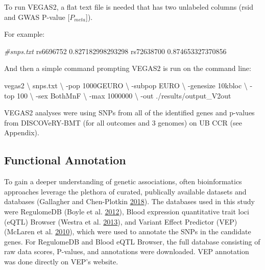\documentclass[]{DissertateOSU}
\newenvironment{Shaded}{\begin{snugshade}}{\end{snugshade}}
\newcommand{\CommentTok}[1]{\textcolor[rgb]{0.56,0.35,0.01}{\textit{#1}}}
\newcommand{\ExtensionTok}[1]{#1}
\newcommand{\NormalTok}[1]{#1}
\begin{document}
To run VEGAS2, a flat text file is needed that has two unlabeled columns
(rsid and GWAS P-value {[}\(P_{meta}\){]}).

\noindent For example:

\singlespaced

\begin{Shaded}
\begin{Highlighting}[]
\CommentTok{#snps.txt}
\ExtensionTok{rs6696752}\NormalTok{   0.827182998293298}
\ExtensionTok{rs72638700}\NormalTok{  0.874653327370856}
\end{Highlighting}
\end{Shaded}

\doublespaced

\noindent And then a simple command prompting VEGAS2 is run on the
command line:

\singlespaced

\begin{Shaded}
\begin{Highlighting}[]
\ExtensionTok{vegas2}\NormalTok{ \textbackslash{}}
\NormalTok{    snps.txt \textbackslash{}}
\NormalTok{    -pop 1000GEURO \textbackslash{}}
\NormalTok{    -subpop EURO \textbackslash{}}
\NormalTok{    -genesize 10kbloc \textbackslash{}}
\NormalTok{    -top 100 \textbackslash{}}
\NormalTok{    -sex BothMnF \textbackslash{}}
\NormalTok{    -max 1000000 \textbackslash{}}
\NormalTok{    -out ./results/output_V2out }
\end{Highlighting}
\end{Shaded}

\doublespaced
\noindent VEGAS2 analyses were using SNPs from all of the identified
genes and p-values from DISCOVeRY-BMT (for all outcomes and 3 genomes)
on UB CCR (see Appendix).

\subsection{Functional Annotation}\label{functional-annotation}

To gain a deeper understanding of genetic associations, often
bioinformatics approaches leverage the plethora of curated, publically
available datasets and databases (Gallagher and Chen-Plotkin
\protect\hyperlink{ref-gallagher_2018}{2018}). The databases used in
this study were RegulomeDB (Boyle et al.
\protect\hyperlink{ref-Boyle_2012}{2012}), Blood expression quantitative
trait loci (eQTL) Browser (Westra et al.
\protect\hyperlink{ref-westra_2013}{2013}), and Variant Effect Predictor
(VEP) (McLaren et al. \protect\hyperlink{ref-vep_2010}{2010}), which
were used to annotate the SNPs in the candidate genes. For RegulomeDB
and Blood eQTL Browser, the full database consisting of raw data scores,
P-values, and annotations were downloaded. VEP annotation was done
directly on VEP's website.
\end{document}
